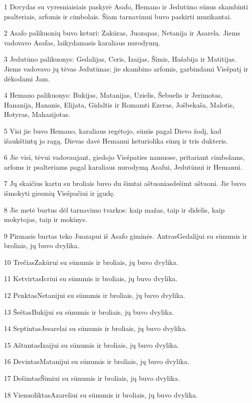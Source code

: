 \par 1 Dovydas su vyresniaisiais paskyrė Asafo, Hemano ir Jedutūno sūnus skambinti psalteriais, arfomis ir cimbolais. Šiam tarnavimui buvo paskirti muzikantai. 
\par 2 Asafo palikuonių buvo keturi: Zakūras, Juozapas, Netanija ir Asarela. Jiems vadovavo Asafas, laikydamasis karaliaus nurodymų. 
\par 3 Jedutūno palikuonys: Gedalijas, Ceris, Izaijas, Šimis, Hašabija ir Matitijas. Jiems vadovavo jų tėvas Jedutūnas; jie skambino arfomis, garbindami Viešpatį ir dėkodami Jam. 
\par 4 Hemano palikuonys: Bukijas, Matanijas, Uzielis, Šebuelis ir Jerimotas, Hananija, Hananis, Elijata, Gidaltis ir Romamti Ezeras, Jošbekaša, Malotis, Hotyras, Mahazijotas. 
\par 5 Visi jie buvo Hemano, karaliaus regėtojo, sūnūs pagal Dievo žodį, kad išaukštintų jo ragą. Dievas davė Hemanui keturiolika sūnų ir tris dukteris. 
\par 6 Jie visi, tėvui vadovaujant, giedojo Viešpaties namuose, pritariant cimbolams, arfoms ir psalteriams pagal karaliaus nurodymą Asafui, Jedutūnui ir Hemanui. 
\par 7 Jų skaičius kartu su broliais buvo du šimtai aštuoniasdešimt aštuoni. Jie buvo išmokyti giesmių Viešpačiui ir įgudę. 
\par 8 Jie metė burtus dėl tarnavimo tvarkos: kaip mažas, taip ir didelis, kaip mokytojas, taip ir mokinys. 
\par 9 Pirmasis burtas teko Juozapui iš Asafo giminės. Antras­Gedalijui su sūnumis ir broliais, jų buvo dvylika. 
\par 10 Trečias­Zakūrui su sūnumis ir broliais, jų buvo dvylika. 
\par 11 Ketvirtas­Icriui su sūnumis ir broliais, jų buvo dvylika. 
\par 12 Penktas­Netanijui su sūnumis ir broliais, jų buvo dvylika. 
\par 13 Šeštas­Bukijui su sūnumis ir broliais, jų buvo dvylika. 
\par 14 Septintas­Jesarelai su sūnumis ir broliais, jų buvo dvylika. 
\par 15 Aštuntas­Izaijui su sūnumis ir broliais, jų buvo dvylika. 
\par 16 Devintas­Matanijui su sūnumis ir broliais, jų buvo dvylika. 
\par 17 Dešimtas­Šimiui su sūnumis ir broliais, jų buvo dvylika. 
\par 18 Vienuoliktas­Azareliui su sūnumis ir broliais, jų buvo dvylika. 
